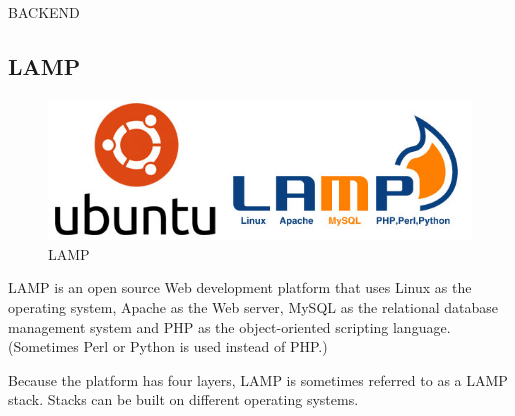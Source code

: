 \newpage
BACKEND
\subsection{LAMP}
\begin{figure}[ht]
\begin{center}
\includegraphics[scale=0.5]{images/lamp.jpg}
\end{center}
\caption{LAMP}
\label{LAMP}
\end{figure}
LAMP is an open source Web development platform that uses Linux as the operating system, Apache as the Web server, MySQL as the relational database management system and PHP as the object-oriented scripting language. (Sometimes Perl or Python is used instead of PHP.)


Because the platform has four layers, LAMP is sometimes referred to as a LAMP stack. Stacks can be built on different operating systems.

